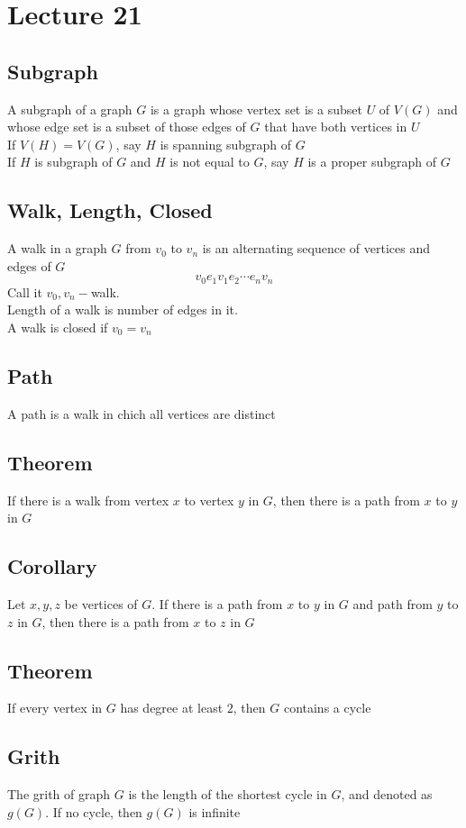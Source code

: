 \documentclass[11pt]{article}
\begin{document}
\section{Lecture 21}
\subsection{Subgraph}
A subgraph of a graph $G$ is a graph whose vertex set is a subset $U$ of $V(G)$ and whose edge set is a subset of those edges of $G$ that have both vertices in $U$ \\
If $V(H)=V(G)$, say $H$ is spanning subgraph of $G$ \\
If $H$ is subgraph of $G$ and $H$ is not equal to $G$, say $H$ is a proper subgraph of $G$ 
\subsection{Walk, Length, Closed}
A walk in a graph $G$ from $v_0$ to $v_n$ is an alternating sequence of vertices and edges of $G$
\[v_0e_1v_1e_2\cdots e_nv_n\]
Call it $v_0,v_n-$walk.\\
Length of a walk is number of edges in it. \\
A walk is closed if $v_0=v_n$
\subsection{Path}
A path is a walk in chich all vertices are distinct 
\subsection{Theorem}
If there is a walk from vertex $x$ to vertex $y$ in $G$, then there is a path from $x$ to $y$ in $G$
\subsection{Corollary}
Let $x,y,z$ be vertices of $G$. If there is a path from $x$ to $y$ in $G$ and path from $y$ to $z$ in $G$, then there is a path from $x$ to $z$ in $G$ 
\subsection{Theorem}
If every vertex in $G$ has degree at least $2$, then $G$ contains a cycle
\subsection{Grith}
The grith of graph $G$ is the length of the shortest cycle in $G$, and denoted as $g(G)$. If no cycle, then $g(G)$ is infinite 
\end{document}

